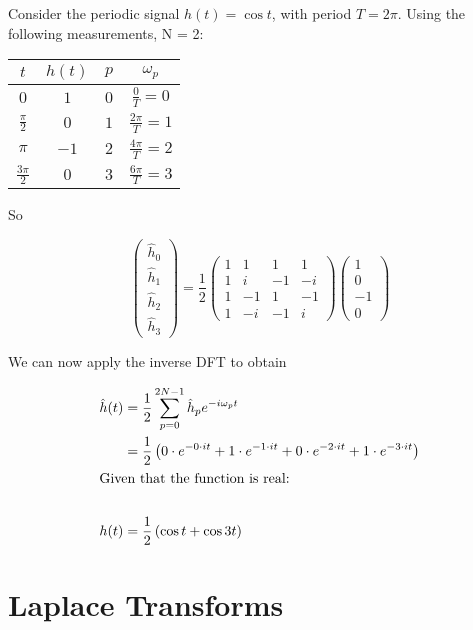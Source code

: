 \documentclass{../../physics_notes}
\begin{document}
\begin{example}{}
Consider the periodic signal $h(t) = \cos{t}$, with period $T = 2\pi$. Using the following measurements, N = 2:


\begin{tabular}{c || c | c | c}
$t$ & $h(t)$ & $p$ & $\omega_p$ \\
\hline
$0$ & $1$ & $0$ & $\frac{0}{T} = 0$ \\
$\frac{\pi}{2}$ & $0$ & $1$ & $\frac{2\pi}{T} = 1$ \\
$\pi$ & $-1$ & $2$ & $\frac{4\pi}{T} = 2$ \\
$\frac{3\pi}{2}$ & $0$ & $3$ & $\frac{6\pi}{T} = 3$
\end{tabular}

So

\begin{equation*}
\begin{pmatrix} \hat{h}_0 \\ \hat{h}_1 \\ \hat{h}_2 \\ \hat{h}_3 \end{pmatrix} = \frac{1}{2}\begin{pmatrix} 1 & 1 & 1 & 1 \\ 1 & i & -1 & -i \\ 1 & -1 & 1 & -1 \\ 1 & -i & -1 & i\end{pmatrix}\begin{pmatrix} 1 \\ 0 \\ -1 \\ 0\end{pmatrix}
\end{equation*}

We can now apply the inverse DFT to obtain

\begin{align*}
\hat{h}(t) &= \frac{1}{2}\sum_{p=0}^{2N-1} \hat{h}_p e^{-i\omega_p t} \\
&= \frac{1}{2}\left( 0\cdot e^{-0\cdot it} + 1\cdot e^{-1\cdot it} + 0\cdot e^{-2\cdot it} + 1\cdot e^{-3\cdot it}\right) \\
\intertext{Given that the function is real:} \\
h(t) &= \frac{1}{2}\left(\cos{t} + \cos{3t}\right)
\end{align*}
\end{example}

\section{Laplace Transforms} 
\end{document}
